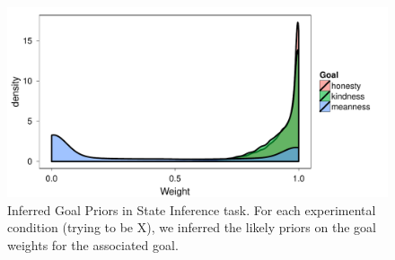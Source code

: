 \documentclass[10pt,letterpaper]{article}
\newcommand{\ndg}[1]{\textcolor{Green}{[ndg: #1]}}
\begin{document}
\begin{figure}
\begin{centering} 
\includegraphics[width=\columnwidth]{figures/goal-priors-bda.pdf}
\caption{\label{fig:goal-priors-bda} Inferred Goal Priors in State Inference task.
For each experimental condition (trying to be X), we inferred the likely priors on the goal weights for the associated goal.
}
\end{centering} 
\end{figure}
\end{document}
